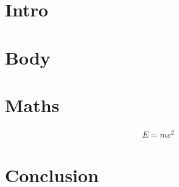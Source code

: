 \documentclass{article}
\begin{document}
\section{Intro}
	\lipsum[2]
\section{Body}
	\lipsum
\section{Maths}
	\begin{align*}
		E = mc^2
	\end{align*}
\section{Conclusion}
	\lipsum[1]
\end{document}
